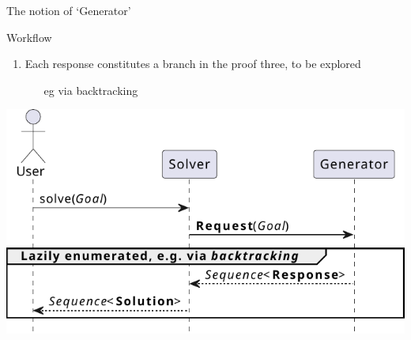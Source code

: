 \documentclass[presentation]{beamer}\mode<presentation>{\usetheme{AMSBolognaFC}}
\begin{document}
\begin{frame}[allowframebreaks]{The notion of `Generator'}
\begin{block}{Workflow}
\begin{enumerate}
            \item Each response constitutes a \alert{branch} in the proof three, \alert{to be explored}
            \begin{itemize}\scriptsize
                \item[eg] via \alert{backtracking} 
            \end{itemize}
        \end{enumerate}
    \end{block}

    \begin{center}
        \includegraphics[width=.6\linewidth]{figures/primitive-usage.pdf}
    \end{center}
\end{frame}
\end{document}
